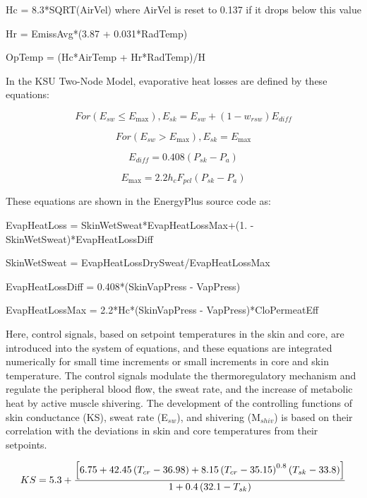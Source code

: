 Hc = 8.3*SQRT(AirVel) where AirVel is reset to 0.137 if it drops below this value

Hr = EmissAvg*(3.87 + 0.031*RadTemp)

OpTemp = (Hc*AirTemp + Hr*RadTemp)/H

In the KSU Two-Node Model, evaporative heat losses are defined by these equations:

\begin{equation}
For \left({E_{sw}} \le {E_{\max }}\right), {E_{sk}} = {E_{sw}} + (1 - {w_{rsw}}){E_{diff}}
\end{equation}

\begin{equation}
For \left({E_{sw}} > {E_{\max }}\right), {E_{sk}} = {E_{\max }}
\end{equation}

\begin{equation}
{E_{diff}} = 0.408({P_{sk}} - {P_a})
\end{equation}

\begin{equation}
{E_{\max }} = 2.2{h_c}{F_{pcl}}({P_{sk}} - {P_a})
\end{equation}

These equations are shown in the EnergyPlus source code as:

EvapHeatLoss = SkinWetSweat*EvapHeatLossMax+(1. - SkinWetSweat)*EvapHeatLossDiff

SkinWetSweat = EvapHeatLossDrySweat/EvapHeatLossMax

EvapHeatLossDiff = 0.408*(SkinVapPress - VapPress)

EvapHeatLossMax = 2.2*Hc*(SkinVapPress - VapPress)*CloPermeatEff

Here, control signals, based on setpoint temperatures in the skin and core, are introduced into the system of equations, and these equations are integrated numerically for small time increments or small increments in core and skin temperature. The control signals modulate the thermoregulatory mechanism and regulate the peripheral blood flow, the sweat rate, and the increase of metabolic heat by active muscle shivering. The development of the controlling functions of skin conductance (KS), sweat rate (E\(_{sw}\)), and shivering (M\(_{shiv}\)) is based on their correlation with the deviations in skin and core temperatures from their setpoints.

\begin{equation}
KS = 5.3 + \frac{\RB{6.75+42.45\PB{T_{cr}-36.98}+8.15\PB{T_{cr}-35.15}^{0.8}\PB{T_{sk}-33.8}}}{1+0.4\PB{32.1-T_{sk}}}
\end{equation}


